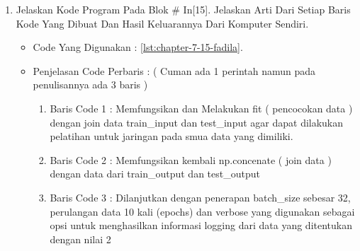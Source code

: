 \begin{enumerate}
\begin{itemize}
\begin{enumerate}
\item Baris Code 9	: Memfungsikan dense pada model untuk output, yang dimana layer berikut akan menjadi jumlah dari class yang ada.
\item Baris Code 10	: Melakukan compile / Mengcompile model yang telah dibuat dan didefinisikan sebelumnya ( diatas )
\item Baris Code 11	: Menampilkan dan mencetak ringkasan dari pemodelan yang dilakukan dari berbagai fungsi yang diterapkan.
\end{enumerate}
\par
\par
\item Hasil : \ref{chapter-7-in-14-fadila}
\par
\par
\begin{figure}[!hbtp]
\centering
\texttt{[image: figures/chapter-7-in-14-fadila.png]}
\caption{Code Program Pada In [14] - fadila}
\label{chapter-7-in-14-fadila}
\end{figure}
\par
\par
\end{itemize}
\par
\par
\par
\item Jelaskan Kode Program Pada Blok \# In[15]. Jelaskan Arti Dari Setiap Baris Kode Yang Dibuat Dan Hasil Keluarannya Dari Komputer Sendiri.
\begin{itemize}
\item Code Yang Digunakan : \ref{lst:chapter-7-15-fadila}.

\par
\par
\item Penjelasan Code Perbaris	: ( Cuman ada 1 perintah namun pada penulisannya ada 3 baris )
\begin{enumerate}
\item Baris Code 1	: Memfungsikan dan Melakukan fit ( pencocokan data ) dengan join data train\_input dan test\_input agar dapat dilakukan pelatihan untuk jaringan pada smua data yang dimiliki.
\item Baris Code 2	: Memfungsikan kembali np.concenate ( join data ) dengan data dari train\_output dan test\_output
\item Baris Code 3	: Dilanjutkan dengan penerapan batch\_size sebesar 32, perulangan data 10 kali (epochs) dan verbose yang digunakan sebagai opsi untuk menghasilkan informasi logging dari data yang ditentukan dengan nilai 2

\end{enumerate}
\end{itemize}
\end{enumerate}
